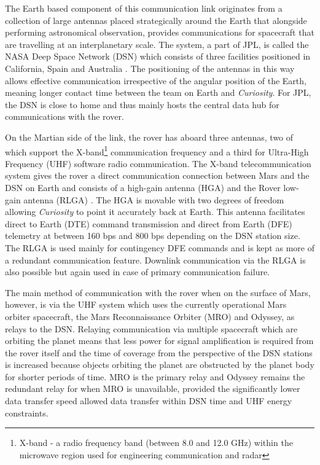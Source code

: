         
        The Earth based component of this communication link originates from a collection of large antennas placed strategically around the Earth that alongside performing astronomical observation, provides communications for spacecraft that are travelling at an interplanetary scale. The system, a part of JPL, is called the NASA Deep Space Network (DSN) which consists of three facilities positioned in California, Spain and Australia \cite{jpldsnabout}. The positioning of the antennas in this way allows effective communication irrespective of the angular position of the Earth, meaning longer contact time between the team on Earth and \textit{Curiosity}. For JPL, the DSN is close to home and thus mainly hosts the central data hub for communications with the rover.
        
        On the Martian side of the link, the rover has aboard three antennas, two of which support the X-band\footnote{X-band - a radio frequency band (between 8.0 and 12.0 GHz) within the microwave region used for engineering communication and radar} communication frequency and a third for Ultra-High Frequency (UHF) software radio communication. The X-band telecommunication system gives the rover a direct communication connection between Mars and the DSN on Earth and consists of a high-gain antenna (HGA) and the Rover low-gain antenna (RLGA) \cite{jpltelecom}. The HGA is movable with two degrees of freedom allowing \textit{Curiosity} to point it accurately back at Earth. This antenna facilitates direct to Earth (DTE) command transmission and direct from Earth (DFE) telemetry at between 160 bps and 800 bps depending on the DSN station size. The RLGA is used mainly for contingency DFE commands and is kept as more of a redundant communication feature. Downlink communication via the RLGA is also possible but again used in case of primary communication failure.
        
        The main method of communication with the rover when on the surface of Mars, however, is via the UHF system which uses the currently operational Mars orbiter spacecraft, the Mars Reconnaissance Orbiter (MRO) and Odyssey, as relays to the DSN. Relaying communication via multiple spacecraft which are orbiting the planet means that less power for signal amplification is required from the rover itself and the time of coverage from the perspective of the DSN stations is increased because objects orbiting the planet are obstructed by the planet body for shorter periods of time. MRO is the primary relay and Odyssey remains the redundant relay for when MRO is unavailable, provided the significantly lower data transfer speed allowed data transfer within DSN time and UHF energy constraints.
        
